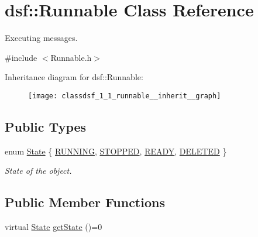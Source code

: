 \hypertarget{classdsf_1_1_runnable}{}\section{dsf\+:\+:Runnable Class Reference}
\label{classdsf_1_1_runnable}


Executing messages.  




{\ttfamily \#include $<$Runnable.\+h$>$}



Inheritance diagram for dsf\+:\+:Runnable\+:\nopagebreak
\begin{figure}[H]
\begin{center}
\leavevmode
\texttt{[image: classdsf\_1\_1\_runnable\_\_inherit\_\_graph]}
\end{center}
\end{figure}
\subsection*{Public Types}
\begin{DoxyCompactItemize}
\item 
enum \hyperlink{classdsf_1_1_runnable_a8eb63b21a0accc7a6a2a05f18e257991}{State} \{ \hyperlink{classdsf_1_1_runnable_a8eb63b21a0accc7a6a2a05f18e257991ad7167727fe5c31678c166aee6801ba0a}{R\+U\+N\+N\+I\+N\+G}, 
\hyperlink{classdsf_1_1_runnable_a8eb63b21a0accc7a6a2a05f18e257991a0897925165e6577c4d3ebb185178c9c5}{S\+T\+O\+P\+P\+E\+D}, 
\hyperlink{classdsf_1_1_runnable_a8eb63b21a0accc7a6a2a05f18e257991a60038f4f186bbe0d05fdbbe9da0f85de}{R\+E\+A\+D\+Y}, 
\hyperlink{classdsf_1_1_runnable_a8eb63b21a0accc7a6a2a05f18e257991aea5cfe327f95ca42d589e660b7cffe28}{D\+E\+L\+E\+T\+E\+D}
 \}
\begin{DoxyCompactList}\small\item\em State of the object. \end{DoxyCompactList}\end{DoxyCompactItemize}
\subsection*{Public Member Functions}
\begin{DoxyCompactItemize}
\item 
virtual \hyperlink{classdsf_1_1_runnable_a8eb63b21a0accc7a6a2a05f18e257991}{State} \hyperlink{classdsf_1_1_runnable_a139342b0d6d53fc7f1bbd97d99d3724a}{get\+State} ()=0
\end{DoxyCompactItemize}

